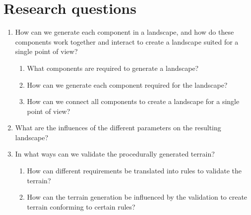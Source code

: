\section{Research questions}
\begin{enumerate}[label={RQ \arabic*:}]
    \item How can we generate each component in a landscape, and how do these components work together and interact to create a landscape suited for a single point of view?
    \begin{enumerate}[label={RQ 1.\arabic*:}]
        \item What components are required to generate a landscape?
        \item How can we generate each component required for the landscape?
        \item How can we connect all components to create a landscape for a single point of view?
    \end{enumerate}

    \item What are the influences of the different parameters on the resulting landscape?

    \item In what ways can we validate the procedurally generated terrain?
    \begin{enumerate}[label={RQ 3.\arabic*:}]
        \item How can different requirements be translated into rules to validate the terrain?
        \item How can the terrain generation be influenced by the validation to create terrain conforming to certain rules?
    \end{enumerate}
\end{enumerate}